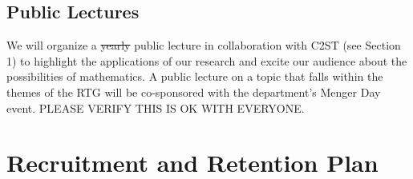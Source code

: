 \documentclass[11pt]{NSFamsart}
\begin{document}
\subsection*{Public Lectures} We will organize a \sout{\color{red}yearly} public lecture in collaboration with  C2ST (see Section 1) to highlight the applications of   our research and excite our audience about the possibilities of mathematics. 
A public lecture on a topic that falls within the themes of the RTG will be co-sponsored  with the department's Menger Day event. {\color{red}PLEASE VERIFY THIS IS OK WITH EVERYONE.}



\section{Recruitment and Retention Plan} \label{sec:RandR}
\end{document}
